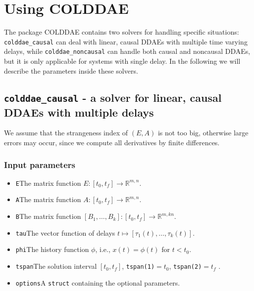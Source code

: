 \documentclass[final,reqno]{siamltex}
\begin{document}
\section{Using COLDDAE}

The package COLDDAE contains two solvers for handling specific situations: {\tt colddae\_causal} can deal with linear, causal DDAEs with multiple time varying delays, 
while {\tt colddae\_noncausal} can handle both causal and noncausal DDAEs, but it is only applicable for systems with single delay. 
In the following we will describe the parameters inside these solvers.

\subsection{{\tt colddae\_causal} - a solver for linear, causal DDAEs with multiple delays}

We assume that the strangeness index of $(E,A)$ is not too big, otherwise large errors may occur, since we compute all derivatives by finite differences.

\subsubsection{Input parameters}
\begin{itemize}
\item {\tt E}\quad The matrix function $E:[t_0,t_f]\rightarrow \mathbb{R}^{m,n}$.
\item {\tt A}\quad The matrix function $A:[t_0,t_f]\rightarrow \mathbb{R}^{m,n}$.
\item {\tt B}\quad The matrix function $[B_1,\ldots,B_{k}]:[t_0,t_f]\rightarrow \mathbb{R}^{m,k n}$.
\item {\tt tau}\quad  The vector function of delays $t\mapsto[\tau_1(t),\ldots,\tau_{k}(t)]$.
\item {\tt phi}\quad The history function $\phi$, i.e.,  $x(t)=\phi(t)$ for $t < t_0$.
\item {\tt tspan}\quad The solution interval $[t_0,t_f]$, {\tt tspan(1)}$ = t_0$, {\tt tspan(2)}$ = t_f$ .
\item {\tt options}\quad A {\tt struct} containing the optional parameters.
\end{itemize}
\end{document}
